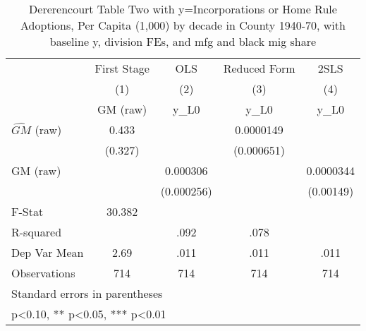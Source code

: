 \begin{table}[htbp]\centering
\def\sym#1{\ifmmode^{#1}\else\(^{#1}\)\fi}
\caption{Dererencourt Table Two with y=Incorporations or Home Rule Adoptions, Per Capita (1,000) by decade in County 1940-70, with baseline y, division FEs, and mfg and black mig share}
\begin{tabular}{l*{4}{c}}
\toprule
                    & First Stage   &         OLS   &Reduced Form   &        2SLS   \\
                    &\multicolumn{1}{c}{(1)}&\multicolumn{1}{c}{(2)}&\multicolumn{1}{c}{(3)}&\multicolumn{1}{c}{(4)}\\
                    &\multicolumn{1}{c}{GM  (raw)}&\multicolumn{1}{c}{y\_L0}&\multicolumn{1}{c}{y\_L0}&\multicolumn{1}{c}{y\_L0}\\
\midrule
$\hat{GM}$ (raw)    &       0.433   &               &   0.0000149   &               \\
                    &     (0.327)   &               &  (0.000651)   &               \\
\addlinespace
GM  (raw)           &               &    0.000306   &               &   0.0000344   \\
                    &               &  (0.000256)   &               &   (0.00149)   \\
\midrule
F-Stat              &      30.382   &               &               &               \\
R-squared           &               &        .092   &        .078   &               \\
Dep Var Mean        &        2.69   &        .011   &        .011   &        .011   \\
Observations        &         714   &         714   &         714   &         714   \\
\bottomrule
\multicolumn{5}{l}{\footnotesize Standard errors in parentheses}\\
\multicolumn{5}{l}{\footnotesize * p<0.10, ** p<0.05, *** p<0.01}\\
\end{tabular}
\end{table}
